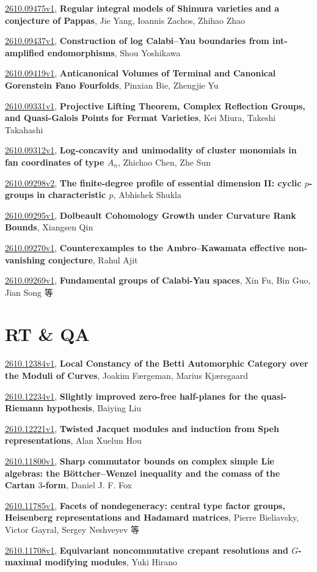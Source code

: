 \documentclass[9pt, a4paper]{article}
\theoremstyle{plain}
\theoremstyle{definition}
\theoremstyle{remark}
\newcommand{\arxiv}[3]{\href{https://arxiv.org/abs/#1}{#1}, \textbf{\textcolor{arxivblue}{#2}}, #3}
\begin{document}
\arxiv{2610.09475v1}{Regular integral models of Shimura varieties and a conjecture of Pappas}{Jie Yang, Ioannis Zachos, Zhihao Zhao}

\arxiv{2610.09437v1}{Construction of log Calabi--Yau boundaries from int-amplified endomorphisms}{Shou Yoshikawa}

\arxiv{2610.09419v1}{Anticanonical Volumes of Terminal and Canonical Gorenstein Fano Fourfolds}{Pinxian Bie, Zhengjie Yu}

\arxiv{2610.09331v1}{Projective Lifting Theorem, Complex Reflection Groups, and Quasi-Galois Points for Fermat Varieties}{Kei Miura, Takeshi Takahashi}

\arxiv{2610.09312v1}{Log-concavity and unimodality of cluster monomials in fan coordinates of type $A_n$}{Zhichao Chen, Zhe Sun}

\arxiv{2610.09298v2}{The finite-degree profile of essential dimension II: cyclic $p$-groups in characteristic $p$}{Abhishek Shukla}

\arxiv{2610.09295v1}{Dolbeault Cohomology Growth under Curvature Rank Bounds}{Xiangsen Qin}

\arxiv{2610.09270v1}{Counterexamples to the Ambro--Kawamata effective non-vanishing conjecture}{Rahul Ajit}

\arxiv{2610.09269v1}{Fundamental groups of Calabi-Yau spaces}{Xin Fu, Bin Guo, Jian Song 等}


\section{RT \& QA}
\arxiv{2610.12384v1}{Local Constancy of the Betti Automorphic Category over the Moduli of Curves}{Joakim Færgeman, Marius Kjærsgaard}

\arxiv{2610.12234v1}{Slightly improved zero-free half-planes for the quasi-Riemann hypothesis}{Baiying Liu}

\arxiv{2610.12221v1}{Twisted Jacquet modules and induction from Speh representations}{Alan Xuelun Hou}

\arxiv{2610.11800v1}{Sharp commutator bounds on complex simple Lie algebras: the Böttcher--Wenzel inequality and the comass of the Cartan $3$-form}{Daniel J. F. Fox}

\arxiv{2610.11785v1}{Facets of nondegeneracy: central type factor groups, Heisenberg representations and Hadamard matrices}{Pierre Bieliavsky, Victor Gayral, Sergey Neshveyev 等}

\arxiv{2610.11708v1}{Equivariant noncommutative crepant resolutions and $G$-maximal modifying modules}{Yuki Hirano}
\end{document}
